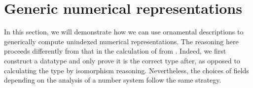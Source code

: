 \begin{comment}
Looking back at \AgdaDatatype{Vec}, ornaments let us show that express that \AgdaDatatype{Vec} can be formed by introducing indices and adding a fields holding an elements to \bN{}.
However, deriving \AgdaDatatype{List} from \bN{} generalizes to \bL{} with less notational overhead, so we tackle that case first. We use the following description of \bN{}
\ExecuteMetaData[Tex/NumRepOrn]{NatD}
Here, \AgdaInductiveConstructor{σ} adds a field to the description, upon which the rest of the description can vary, and \AgdaInductiveConstructor{ṿ} lists the recursive fields and their indices (which can only be \AgdaInductiveConstructor{tt}).
We can now write down the ornament which adds fields to the \AgdaFunction{suc} constructor
\ExecuteMetaData[Tex/NumRepOrn]{ListO}
Here, the \AgdaInductiveConstructor{σ} and \AgdaInductiveConstructor{ṿ} are forced to match those of \AgdaDatatype{NatD},
but the \AgdaInductiveConstructor{Δ} adds a new field. Using the least fixpoint and description extraction, we can then define \AgdaDatatype{List} from this ornamental description. Note that we cannot hope to give an unindexed ornament from \bL{}
\ExecuteMetaData[Tex/NumRepOrn]{LeibnizD}
into trees, since trees have a very different recursive structure! Thus, we must keep track at what level we are in the tree so that we can ask for adequately many elements:
\ExecuteMetaData[Tex/NumRepOrn]{TreeO}
We use the \AgdaFunction{power} combinator to ensure that the digit at position $n$, which has weight $2^n$ in the interpretation of a binary number, also holds its value times $2^n$ elements. This makes sure that the number of elements in the tree shaped after a given binary number also is the value of that  binary number.
\end{comment}


\section{Generic numerical representations}\label{sec:trieo}
In this section, we will demonstrate how we can use ornamental descriptions to generically compute unindexed numerical representations. 
The reasoning here proceeds differently from that in the calculation of  from \bN{}. Indeed, we first construct a datatype and only prove it is the correct type after, as opposed to calculating the type by isomorphism reasoning. Nevertheless, the choices of fields depending on the analysis of a number system follow the same strategy.

